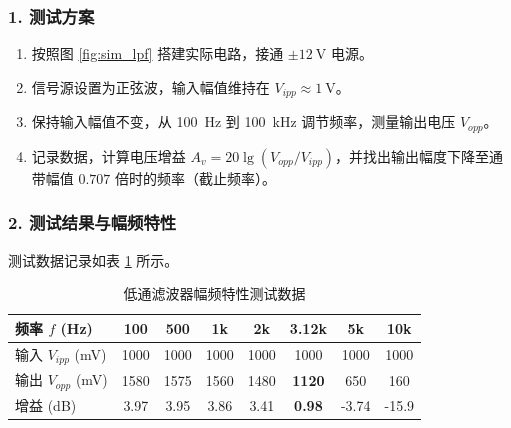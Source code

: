 \documentclass[UTF8, a4paper]{ctexrep} %
\begin{document}
\subsubsection{1. 测试方案}
\begin{enumerate}
    \item 按照图 \ref{fig:sim_lpf} 搭建实际电路，接通 $\pm \SI{12}{\volt}$ 电源。
    \item 信号源设置为正弦波，输入幅值维持在 $V_{ipp} \approx \SI{1}{\volt}$。
    \item 保持输入幅值不变，从 \SI{100}{\hertz} 到 \SI{100}{\kilo\hertz} 调节频率，测量输出电压 $V_{opp}$。
    \item 记录数据，计算电压增益 $A_v = 20\lg(V_{opp}/V_{ipp})$，并找出输出幅度下降至通带幅值 $0.707$ 倍时的频率（截止频率）。
\end{enumerate}



\subsubsection{2. 测试结果与幅频特性}
测试数据记录如表 \ref{tab:lpf_data} 所示。

\begin{table}[htbp]
    \centering
    \caption{低通滤波器幅频特性测试数据}
    \label{tab:lpf_data}
    \begin{tabular}{l c c c c c c c}
        \toprule
        频率 $f$ (\unit{\hertz}) & 100 & 500 & 1k & 2k & \textbf{3.12k} & 5k & 10k \\
        \midrule
        输入 $V_{ipp}$ (\unit{\milli\volt}) & 1000 & 1000 & 1000 & 1000 & 1000 & 1000 & 1000 \\
        输出 $V_{opp}$ (\unit{\milli\volt}) & 1580 & 1575 & 1560 & 1480 & \textbf{1120} & 650 & 160 \\
        增益 (\unit{dB}) & 3.97 & 3.95 & 3.86 & 3.41 & \textbf{0.98} & -3.74 & -15.9 \\
        \bottomrule
    \end{tabular}
\end{table}
\end{document}
